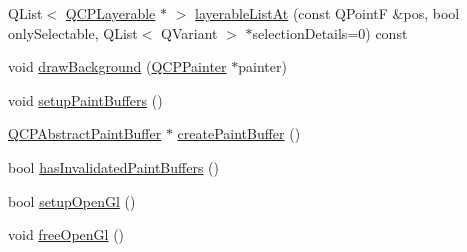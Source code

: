 \begin{DoxyCompactItemize}
\item 
Q\+List$<$ \hyperlink{class_q_c_p_layerable}{Q\+C\+P\+Layerable} $\ast$ $>$ \hyperlink{class_q_custom_plot_af80753be504e55fdcc366845c021d7cb}{layerable\+List\+At} (const Q\+PointF \&pos, bool only\+Selectable, Q\+List$<$ Q\+Variant $>$ $\ast$selection\+Details=0) const 
\item 
void \hyperlink{class_q_custom_plot_a05dd52438cee4353b18c1e53a439008d}{draw\+Background} (\hyperlink{class_q_c_p_painter}{Q\+C\+P\+Painter} $\ast$painter)
\item 
void \hyperlink{class_q_custom_plot_a2685341f7242c3882f4cc5e379308d71}{setup\+Paint\+Buffers} ()
\item 
\hyperlink{class_q_c_p_abstract_paint_buffer}{Q\+C\+P\+Abstract\+Paint\+Buffer} $\ast$ \hyperlink{class_q_custom_plot_a943b57596a1adf7f0e75c3b50e407ae6}{create\+Paint\+Buffer} ()
\item 
bool \hyperlink{class_q_custom_plot_ad452b582348c8e99462d83fe1cd0279b}{has\+Invalidated\+Paint\+Buffers} ()
\item 
bool \hyperlink{class_q_custom_plot_a8954c4667c51070ff4e9b02d858fd190}{setup\+Open\+Gl} ()
\item 
void \hyperlink{class_q_custom_plot_aaa3073362074581a7b5905726b4a0067}{free\+Open\+Gl} ()
\end{DoxyCompactItemize}
